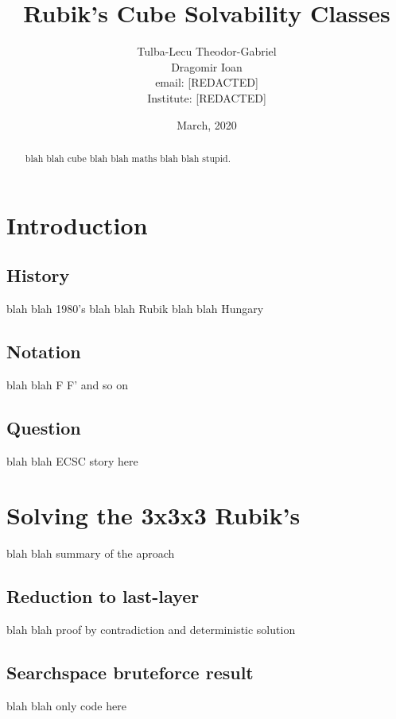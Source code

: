 \documentclass{article}
\title{Rubik's Cube Solvability Classes}
\date{March, 2020}
\author{Tulba-Lecu Theodor-Gabriel\\
	Dragomir Ioan\\
	email: [REDACTED] \\
	Institute: [REDACTED]}
\begin{document}
    
    \maketitle


    \begin{abstract}
        blah blah cube blah blah maths blah blah stupid.
    \end{abstract}

    \tableofcontents
    
    \newpage

    \section{Introduction}
    
        \subsection{History}
            blah blah 1980's blah blah Rubik blah blah Hungary
        
        \subsection{Notation}
            blah blah F F' and so on
        
        \subsection{Question}
            blah blah ECSC story here
    
    \section{Solving the 3x3x3 Rubik's}
        blah blah summary of the aproach
    
        \subsection{Reduction to last-layer}
            blah blah proof by contradiction and deterministic solution
        
        \subsection{Searchspace bruteforce result}
            blah blah only code here
        
\end{document}
